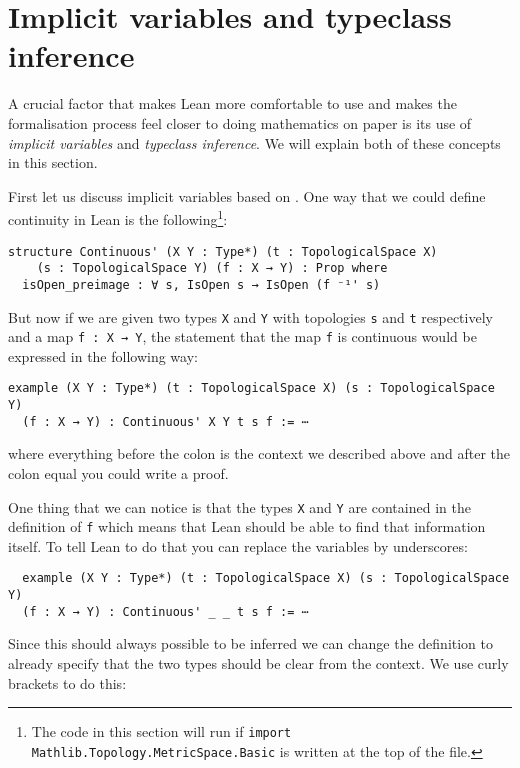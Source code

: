 \section{Implicit variables and typeclass inference}
\label{sec:implicitandtypeclass}

A crucial factor that makes Lean more comfortable to use and makes the formalisation process feel closer to doing mathematics on paper is its use of \emph{implicit variables} and \emph{typeclass inference}. 
We will explain both of these concepts in this section.

First let us discuss implicit variables based on \cite{Avigad2024}. 
One way that we could define continuity in Lean is the following\cprotect\footnote{The code in this section will run if \lstinline{import Mathlib.Topology.MetricSpace.Basic} is written at the top of the file.}:

\begin{lstlisting}
structure Continuous' (X Y : Type*) (t : TopologicalSpace X) 
    (s : TopologicalSpace Y) (f : X → Y) : Prop where
  isOpen_preimage : ∀ s, IsOpen s → IsOpen (f ⁻¹' s)
\end{lstlisting}

But now if we are given two types \lstinline{X} and \lstinline{Y} with topologies \lstinline{s} and \lstinline{t} respectively and a map \lstinline{f : X → Y}, the statement that the map \lstinline{f} is continuous would be expressed in the following way:

\begin{lstlisting}
example (X Y : Type*) (t : TopologicalSpace X) (s : TopologicalSpace Y) 
  (f : X → Y) : Continuous' X Y t s f := ⋯
\end{lstlisting}

where everything before the colon is the context we described above and after the colon equal you could write a proof.

One thing that we can notice is that the types \lstinline{X} and \lstinline{Y} are contained in the definition of \lstinline{f} which means that Lean should be able to find that information itself. 
To tell Lean to do that you can replace the variables by underscores: 

\begin{lstlisting}
  example (X Y : Type*) (t : TopologicalSpace X) (s : TopologicalSpace Y) 
  (f : X → Y) : Continuous' _ _ t s f := ⋯
\end{lstlisting}

Since this should always possible to be inferred we can change the definition to already specify that the two types should be clear from the context. 
We use curly brackets to do this: 

